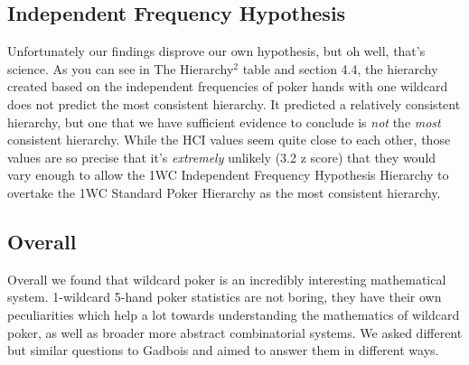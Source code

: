 \documentclass[16pt]{article}
\begin{document}
\subsection{Independent Frequency Hypothesis}
Unfortunately our findings disprove our own hypothesis, but oh well, that's science. As you can see in The Hierarchy$^2$ table and section 4.4, the hierarchy created based on the independent frequencies of poker hands with one wildcard does not predict the most consistent hierarchy. It predicted a relatively consistent hierarchy, but one that we have sufficient evidence to conclude is \textit{not} the \textit{most} consistent hierarchy. While the HCI values seem quite close to each other, those values are so precise that it's \textit{extremely} unlikely (3.2 z score) that they would vary enough to allow the 1WC Independent Frequency Hypothesis Hierarchy to overtake the 1WC Standard Poker Hierarchy as the most consistent hierarchy.

\subsection{Overall}
Overall we found that wildcard poker is an incredibly interesting mathematical system. 1-wildcard 5-hand poker statistics are not boring, they have their own peculiarities which help a lot towards understanding the mathematics of wildcard poker, as well as broader more abstract combinatorial systems. We asked different but similar questions to Gadbois and aimed to answer them in different ways.
\end{document}
